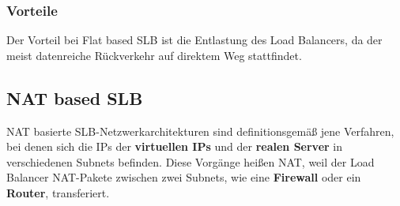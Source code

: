 \subsubsection{Vorteile}
Der Vorteil bei Flat based SLB ist die Entlastung des Load Balancers, da der meist datenreiche Rückverkehr auf direktem Weg stattfindet.

\newpage
\subsection{NAT based SLB}\cite{SLBbook}
\label{NATSLB}
NAT basierte SLB-Netzwerkarchitekturen sind definitionsgemäß jene Verfahren, bei denen sich die IPs der \textbf{virtuellen IPs} und der \textbf{realen Server} in verschiedenen Subnets befinden. Diese Vorgänge heißen NAT, weil der Load Balancer NAT-Pakete zwischen zwei Subnets, wie eine \textbf{Firewall} oder ein \textbf{Router}, transferiert.

